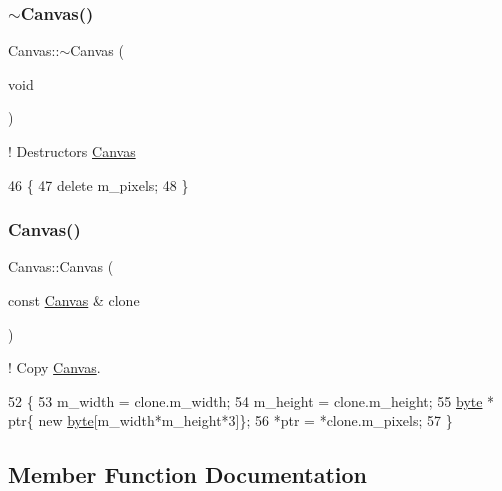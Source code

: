 \subsubsection{\texorpdfstring{$\sim$\+Canvas()}{~Canvas()}}
{\footnotesize\ttfamily Canvas\+::$\sim$\+Canvas (\begin{DoxyParamCaption}\item[{void}]{ }\end{DoxyParamCaption})\hspace{0.3cm}{\ttfamily [inline]}}



! Destructors \hyperlink{classCanvas}{Canvas} 


\begin{DoxyCode}
46         \{
47             \textcolor{keyword}{delete} m\_pixels;
48         \}
\end{DoxyCode}
\mbox{\label{classCanvas_afcffecf500f90749912bfe626eba9acc}} 
\subsubsection{\texorpdfstring{Canvas()}{Canvas()}\hspace{0.1cm}{\footnotesize\ttfamily [2/2]}}
{\footnotesize\ttfamily Canvas\+::\+Canvas (\begin{DoxyParamCaption}\item[{const \hyperlink{classCanvas}{Canvas} \&}]{clone }\end{DoxyParamCaption})\hspace{0.3cm}{\ttfamily [inline]}}



! Copy \hyperlink{classCanvas}{Canvas}. 


\begin{DoxyCode}
52         \{
53             m\_width = clone.m\_width;
54             m\_height = clone.m\_height;
55             \hyperlink{canvas_8h_a0c8186d9b9b7880309c27230bbb5e69d}{byte} * ptr\{ \textcolor{keyword}{new} \hyperlink{canvas_8h_a0c8186d9b9b7880309c27230bbb5e69d}{byte}[m\_width*m\_height*3]\};
56             *ptr = *clone.m\_pixels;
57         \}
\end{DoxyCode}


\subsection{Member Function Documentation}
\mbox{\label{classCanvas_a6e1c6baa6fb92cd3de1726b67b51aa38}} 
